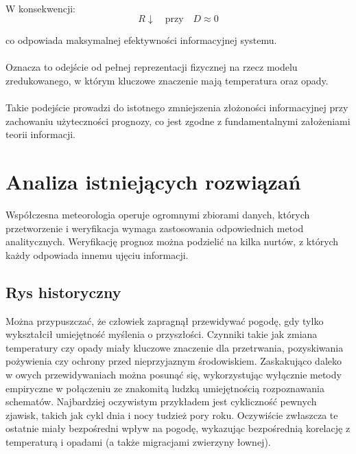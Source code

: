 \documentclass[a4paper,12pt]{article}
\begin{document}
\paragraph{}
W konsekwencji:
\[
R \downarrow \quad \text{przy} \quad D \approx 0
\]

co odpowiada maksymalnej efektywności informacyjnej systemu.

\paragraph{}
Oznacza to odejście od pełnej reprezentacji fizycznej na rzecz modelu
zredukowanego, w którym kluczowe znaczenie mają temperatura oraz opady.

\paragraph{}
Takie podejście prowadzi do istotnego zmniejszenia złożoności informacyjnej przy
zachowaniu użyteczności prognozy, co jest zgodne z fundamentalnymi założeniami
teorii informacji.
\newpage
\newpage
\section{Analiza istniejących rozwiązań}

Współczesna meteorologia operuje ogromnymi zbiorami danych, których przetworzenie i weryfikacja wymaga zastosowania odpowiednich metod analitycznych. Weryfikację prognoz można podzielić na kilka nurtów, z których każdy odpowiada innemu ujęciu informacji.


\subsection{Rys historyczny}


Można przypuszczać, że człowiek zapragnął przewidywać pogodę, gdy tylko wykształcił umiejętność myślenia o przyszłości. Czynniki takie jak zmiana temperatury czy opady miały kluczowe znaczenie dla przetrwania, pozyskiwania pożywienia czy ochrony przed nieprzyjaznym środowiskiem. Zaskakująco daleko w owych przewidywaniach można posunąć się, wykorzystując wyłącznie metody empiryczne w połączeniu ze znakomitą ludzką umiejętnością rozpoznawania schematów. Najbardziej oczywistym przykładem jest cykliczność pewnych zjawisk, takich jak cykl dnia i nocy tudzież pory roku. Oczywiście zwłaszcza te ostatnie miały bezpośredni wpływ na pogodę, wykazując bezpośrednią korelację z temperaturą i opadami (a także migracjami zwierzyny łownej).
\end{document}
